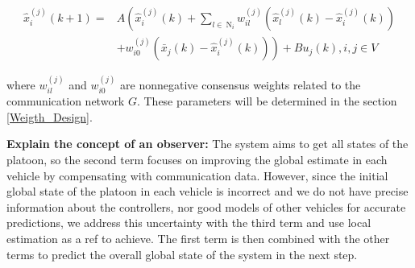 \documentclass[letterpaper, 10pt, conference]{ieeeconf}  %
\begin{document}
\begin{equation}\label{dis_obs}
\begin{aligned}
\hat{x}_i^{(j)}(k+1)= & A\left(\hat{x}_i^{(j)}(k)+\sum_{l \in \mathrm{~N}_i} w_{i l}^{(j)}\left(\hat{x}_l^{(j)}(k)-\hat{x}_i^{(j)}(k)\right)\right. \\
& \left.+w_{i 0}^{(j)}\left(\bar{x}_j(k)-\hat{x}_i^{(j)}(k)\right)\right)+B u_j(k), i, j \in V
\end{aligned}
\end{equation}

where $w_{il}^{(j)}$ and
$w_{i0}^{(j)}$ are nonnegative consensus weights related to the communication
network $G$. These parameters will be determined in the section \ref{Weigth_Design}. 


\textbf{Explain the concept of an observer:} The system aims to get all states of the platoon, so the second term focuses on improving the global estimate in each vehicle by compensating with communication data. However, since the initial global state of the platoon in each vehicle is incorrect and we do not have precise information about the controllers, nor good models of other vehicles for accurate predictions, we address this uncertainty with the third term and use local estimation as a ref to achieve. The first term is then combined with the other terms to predict the overall global state of the system in the next step.



\end{document}
